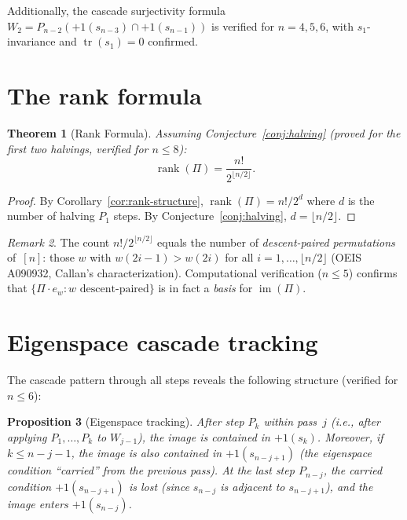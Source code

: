 \documentclass[11pt]{article}
\newtheorem{theorem}{Theorem}
\newtheorem{proposition}[theorem]{Proposition}
\theoremstyle{definition}
\theoremstyle{remark}
\newtheorem{remark}[theorem]{Remark}
\newcommand{\im}{\operatorname{im}}
\newcommand{\tr}{\operatorname{tr}}
\newcommand{\rk}{\operatorname{rank}}
\begin{document}
\medskip
\noindent Additionally, the cascade surjectivity formula
$W_2 = P_{n-2}(+1(s_{n-3}) \cap +1(s_{n-1}))$ is verified for
$n = 4, 5, 6$, with $s_1$-invariance and $\tr(s_1) = 0$ confirmed.


\section{The rank formula}

\begin{theorem}[Rank Formula]
\label{thm:rank}
Assuming Conjecture~\ref{conj:halving} (proved for the first two
halvings, verified for $n \le 8$):
\[
  \rk(\Pi) = \frac{n!}{2^{\lfloor n/2\rfloor}}.
\]
\end{theorem}

\begin{proof}
By Corollary~\ref{cor:rank-structure}, $\rk(\Pi) = n!/2^d$ where $d$ is
the number of halving $P_1$ steps. By Conjecture~\ref{conj:halving},
$d = \lfloor n/2 \rfloor$.
\end{proof}

\begin{remark}
The count $n!/2^{\lfloor n/2\rfloor}$ equals the number of
\emph{descent-paired permutations} of~$[n]$: those $w$ with
$w(2i{-}1) > w(2i)$ for all $i = 1, \dots, \lfloor n/2 \rfloor$
(OEIS A090932, Callan's characterization). Computational verification
($n \le 5$) confirms that $\{\Pi \cdot e_w : w \text{ descent-paired}\}$
is in fact a \emph{basis} for $\im(\Pi)$.
\end{remark}


\section{Eigenspace cascade tracking}

The cascade pattern through all steps reveals the following structure
(verified for $n \le 6$):

\begin{proposition}[Eigenspace tracking]
After step $P_k$ within pass~$j$ (i.e., after applying $P_1, \dots, P_k$
to $W_{j-1}$), the image is contained in $+1(s_k)$. Moreover, if
$k \le n - j - 1$, the image is also contained in $+1(s_{n-j+1})$
(the eigenspace condition ``carried'' from the previous pass).
At the last step $P_{n-j}$, the carried condition $+1(s_{n-j+1})$
is lost (since $s_{n-j}$ is adjacent to $s_{n-j+1}$), and the
image enters $+1(s_{n-j})$.
\end{proposition}
\end{document}
